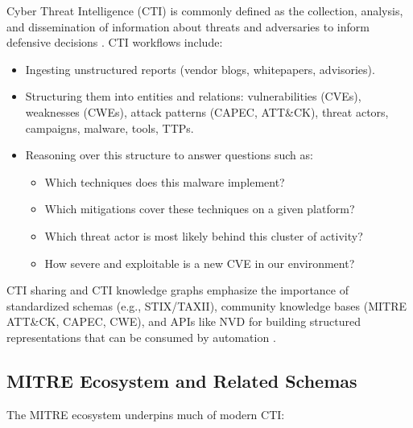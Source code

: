 \documentclass[unnumsec,webpdf,contemporary,large]{oup-authoring-template}
\theoremstyle{thmstyleone}
\theoremstyle{thmstyletwo}
\theoremstyle{thmstylethree}
\begin{document}
Cyber Threat Intelligence (CTI) is commonly defined as the collection, analysis, and dissemination of information about threats and adversaries to inform defensive decisions \cite{mcmillan2013gartner}. CTI workflows include:

\begin{itemize}
  \item Ingesting unstructured reports (vendor blogs, whitepapers, advisories).
  \item Structuring them into entities and relations: vulnerabilities (CVEs), weaknesses (CWEs), attack patterns (CAPEC, ATT\&CK), threat actors, campaigns, malware, tools, TTPs.
  \item Reasoning over this structure to answer questions such as:
    \begin{itemize}
      \item Which techniques does this malware implement?
      \item Which mitigations cover these techniques on a given platform?
      \item Which threat actor is most likely behind this cluster of activity?
      \item How severe and exploitable is a new CVE in our environment?
    \end{itemize}
\end{itemize}

CTI sharing and CTI knowledge graphs emphasize the importance of standardized schemas (e.g., STIX/TAXII), community knowledge bases (MITRE ATT\&CK, CAPEC, CWE), and APIs like NVD for building structured representations that can be consumed by automation \cite{strom2018mitreattck,mitreCVE,mitreCWE,mitreCAPEC}.

\subsection{MITRE Ecosystem and Related Schemas}

The MITRE ecosystem underpins much of modern CTI:
\end{document}
